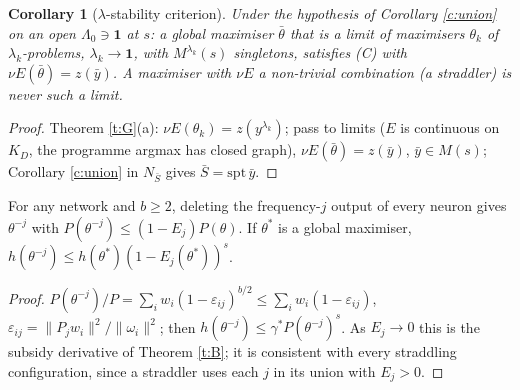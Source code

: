 \documentclass[11pt]{article}
\newtheorem{corollary}[theorem]{Corollary}
\theoremstyle{remark}\newtheorem{remark}[theorem]{Remark}
\begin{document}
\begin{corollary}[$\lambda$-stability criterion]\label{c:stab}
Under the hypothesis of Corollary \ref{c:union} on an open $\Lambda_0\ni\mathbf1$ at $s$: a global maximiser $\bar\theta$ that is a
limit of maximisers $\theta_k$ of $\lambda_k$-problems, $\lambda_k\to\mathbf1$, with $M^{\lambda_k}(s)$ singletons, satisfies (C) with
$\nu E(\bar\theta)=z(\bar y)$. A maximiser with $\nu E$ a non-trivial combination (a straddler) is never such a limit.
\end{corollary}
\begin{proof}
Theorem \ref{t:G}(a): $\nu E(\theta_k)=z(y^{\lambda_k})$; pass to limits ($E$ is continuous on $K_D$, the programme argmax has closed
graph), $\nu E(\bar\theta)=z(\bar y)$, $\bar y\in M(s)$; Corollary \ref{c:union} in $N_{\bar S}$ gives $\bar S=\mathrm{spt}\,\bar y$.
\end{proof}

\begin{lemma}\label{l:removal}
For any network and $b\ge2$, deleting the frequency-$j$ output of every neuron gives $\theta^{-j}$ with
$P(\theta^{-j})\le(1-E_j)P(\theta)$. If $\theta^*$ is a global maximiser, $h(\theta^{-j})\le h(\theta^*)(1-E_j(\theta^*))^s$.
\end{lemma}
\begin{proof}
$P(\theta^{-j})/P=\sum_iw_i(1-\varepsilon_{ij})^{b/2}\le\sum_iw_i(1-\varepsilon_{ij})$, $\varepsilon_{ij}=\|P_jw_i\|^2/\|\omega_i\|^2$; then
$h(\theta^{-j})\le\gamma^*P(\theta^{-j})^s$. As $E_j\to0$ this is the subsidy derivative of Theorem \ref{t:B}; it is consistent with
every straddling configuration, since a straddler uses each $j$ in its union with $E_j>0$.
\end{proof}
\end{document}
